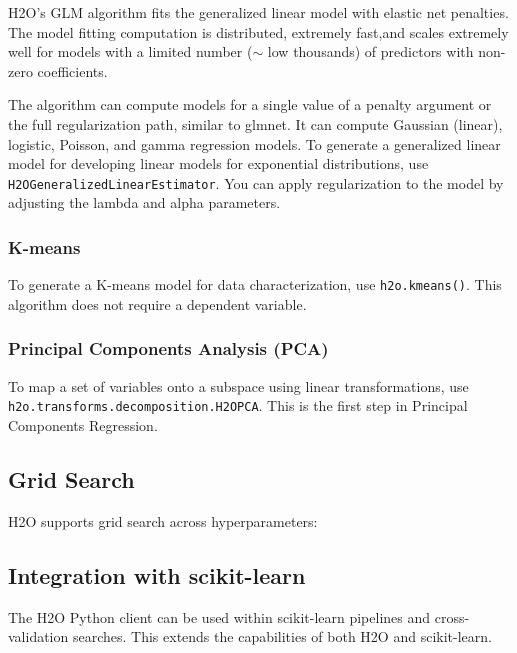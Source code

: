 {H2O's GLM algorithm fits the generalized linear model with
elastic net penalties. The model fitting computation is distributed,
extremely fast,and scales extremely well for models with a limited
number ($\sim$ low thousands) of predictors with non-zero
coefficients. 

The algorithm can compute models for a single value of a penalty argument or the full regularization path, similar to glmnet. It can compute Gaussian (linear), logistic, Poisson, and gamma regression models.
To generate a generalized linear model for developing
linear models for exponential distributions, use
{\texttt{H2OGeneralizedLinearEstimator}}. You can apply
regularization to the model by adjusting the lambda and alpha
parameters.



\newpage
\subsubsection{K-means}
To generate a K-means model for data characterization, use
{\texttt{h2o.kmeans()}}. This algorithm does not require a
dependent variable.



\subsubsection{Principal Components Analysis (PCA)}
To map a set of variables onto a subspace using linear
transformations, use {\texttt{h2o.transforms.decomposition.H2OPCA}}.
This is the first step in Principal Components Regression.


\newpage

\subsection{Grid Search}
H2O supports grid search across hyperparameters:




\subsection{Integration with scikit-learn}
The H2O Python client can be used within scikit-learn pipelines and cross-validation searches.  This extends the capabilities of both H2O and scikit-learn.
}
